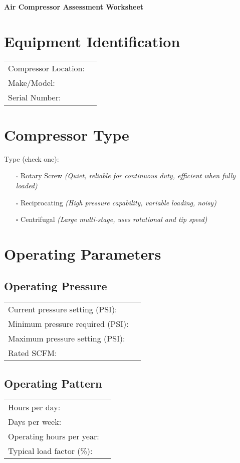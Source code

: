 \documentclass[./main.tex]{subfiles}
\begin{document}
\begin{center}
\Large\textbf{Air Compressor Assessment Worksheet}
\end{center}

\section*{Equipment Identification}
\noindent\begin{tabularx}{\textwidth}{@{}lX@{}}
Compressor Location: & \hrulefill \\[2ex]
Make/Model: & \hrulefill \\[2ex]
Serial Number: & \hrulefill \\[2ex]
\end{tabularx}

\section*{Compressor Type}
\noindent Type (check one):
\begin{itemize}[leftmargin=1cm]
\item[$\square$] Rotary Screw \hfill \textit{(Quiet, reliable for continuous duty, efficient when fully loaded)}
\item[$\square$] Reciprocating \hfill \textit{(High pressure capability, variable loading, noisy)}
\item[$\square$] Centrifugal \hfill \textit{(Large multi-stage, uses rotational and tip speed)}
\end{itemize}

\section*{Operating Parameters}
\subsection*{Operating Pressure}
\noindent\begin{tabularx}{\textwidth}{@{}lX@{}}
Current pressure setting (PSI): & \hrulefill \\[2ex]
Minimum pressure required (PSI): & \hrulefill \\[2ex]
Maximum pressure setting (PSI): & \hrulefill \\[2ex]
Rated SCFM: & \hrulefill \\[2ex]
\end{tabularx}

\subsection*{Operating Pattern}
\noindent\begin{tabularx}{\textwidth}{@{}lX@{}}
Hours per day: & \hrulefill \\[2ex]
Days per week: & \hrulefill \\[2ex]
Operating hours per year: & \hrulefill \\[2ex]
Typical load factor (\%): & \hrulefill \\[2ex]
\end{tabularx}
\end{document}
